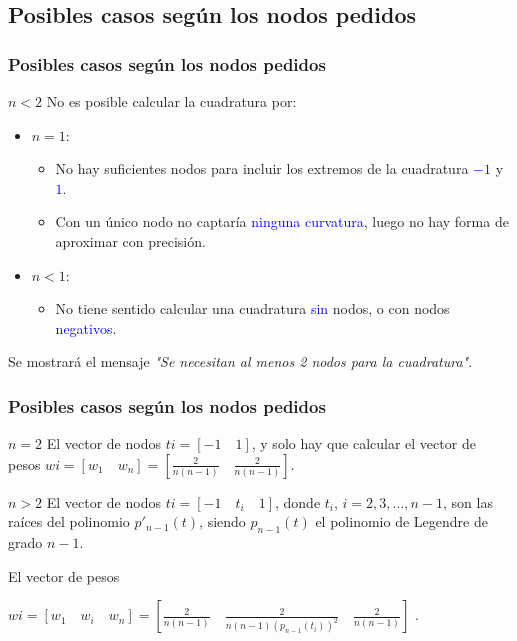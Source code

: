 \documentclass{beamer}
\begin{document}
\subsection{Posibles casos según los nodos pedidos}
\begin{frame}
\frametitle{Posibles casos según los nodos pedidos}
\begin{block}{$n<2$}
No es posible calcular  la cuadratura por:
\begin{itemize}
    \item $n=1$:
    \begin{itemize}
        \item No hay suficientes nodos para incluir los extremos de la cuadratura \textcolor{blue}{$-1$} y \textcolor{blue}{$1$}.
        \item Con un único nodo no captaría \textcolor{blue}{ninguna curvatura}, luego no hay forma de aproximar con precisión.
    \end{itemize}
    \item $n<1$: 
    \begin{itemize}
        \item No tiene sentido calcular una cuadratura \textcolor{blue}{sin} nodos, o con nodos \textcolor{blue}{negativos}.
    \end{itemize}
\end{itemize}
Se mostrará el mensaje \textit{"Se necesitan al menos 2 nodos para la cuadratura"}.
\end{block}

\end{frame}

\begin{frame}
\frametitle{Posibles casos según los nodos pedidos}

\begin{block}{$n=2$}
El vector de nodos $ti=[-1\quad 1]$, y solo hay que calcular el vector de pesos $wi=[w_1\quad w_n]=\left[\tfrac{2}{n(n-1)}\quad \tfrac{2}{n(n-1)}\right]$.
\end{block}

\begin{block}{$n>2$} 
El vector de nodos $ti=[-1\quad t_i \quad 1]$, donde $t_i$, $i=2, 3,...,n-1$, son las raíces del polinomio $p'_{n-1}(t)$, siendo $p_{n-1}(t)$ el polinomio de Legendre de grado $n-1$.

El vector de pesos 

$wi=[w_1 \quad w_i \quad w_n]= \left[\tfrac{2}{n(n-1)} \quad \frac{2}{n(n-1)(p_{n-1}(t_i))^2} \quad \tfrac{2}{n(n-1)}\right]$
.
\end{block}
\end{frame}
\end{document}
